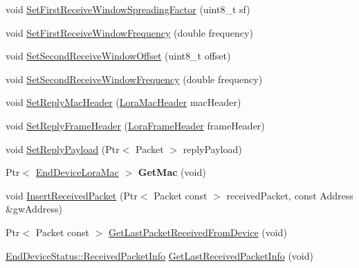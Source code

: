 \begin{DoxyCompactItemize}
\item 
void \hyperlink{classns3_1_1lorawan_1_1EndDeviceStatus_ac39c49bf91b1bcdbf08add2694bca011}{Set\+First\+Receive\+Window\+Spreading\+Factor} (uint8\+\_\+t sf)
\item 
void \hyperlink{classns3_1_1lorawan_1_1EndDeviceStatus_a0a5445bfba22ce6dd318128eb4e8bc59}{Set\+First\+Receive\+Window\+Frequency} (double frequency)
\item 
void \hyperlink{classns3_1_1lorawan_1_1EndDeviceStatus_ac901c8879c93c79c7cc6fae82cb14909}{Set\+Second\+Receive\+Window\+Offset} (uint8\+\_\+t offset)
\item 
void \hyperlink{classns3_1_1lorawan_1_1EndDeviceStatus_a19b88dd518ed0885f7e4a59a5cd3feb7}{Set\+Second\+Receive\+Window\+Frequency} (double frequency)
\item 
void \hyperlink{classns3_1_1lorawan_1_1EndDeviceStatus_a68017acffb75ff0ccf70347dcd325b84}{Set\+Reply\+Mac\+Header} (\hyperlink{classns3_1_1lorawan_1_1LoraMacHeader}{Lora\+Mac\+Header} mac\+Header)
\item 
void \hyperlink{classns3_1_1lorawan_1_1EndDeviceStatus_a2f8b9b43a6d4b3af2be53777877e6787}{Set\+Reply\+Frame\+Header} (\hyperlink{classns3_1_1lorawan_1_1LoraFrameHeader}{Lora\+Frame\+Header} frame\+Header)
\item 
void \hyperlink{classns3_1_1lorawan_1_1EndDeviceStatus_aa21d19b3898ae972c644ec94993813ec}{Set\+Reply\+Payload} (Ptr$<$ Packet $>$ reply\+Payload)
\item 
\mbox{\label{classns3_1_1lorawan_1_1EndDeviceStatus_a4fee5c291db27d3656ef5268b5e31137}} 
Ptr$<$ \hyperlink{classns3_1_1lorawan_1_1EndDeviceLoraMac}{End\+Device\+Lora\+Mac} $>$ {\bfseries Get\+Mac} (void)
\item 
void \hyperlink{classns3_1_1lorawan_1_1EndDeviceStatus_a57c324b1fc3708fab5b3a6c638226d91}{Insert\+Received\+Packet} (Ptr$<$ Packet const $>$ received\+Packet, const Address \&gw\+Address)
\item 
Ptr$<$ Packet const  $>$ \hyperlink{classns3_1_1lorawan_1_1EndDeviceStatus_ab4ead237afea3a967bced521bc474e47}{Get\+Last\+Packet\+Received\+From\+Device} (void)
\item 
\hyperlink{structns3_1_1lorawan_1_1EndDeviceStatus_1_1ReceivedPacketInfo}{End\+Device\+Status\+::\+Received\+Packet\+Info} \hyperlink{classns3_1_1lorawan_1_1EndDeviceStatus_a282dab8b89f752ae913e22d348b24c3f}{Get\+Last\+Received\+Packet\+Info} (void)
\item 

\end{DoxyCompactItemize}
